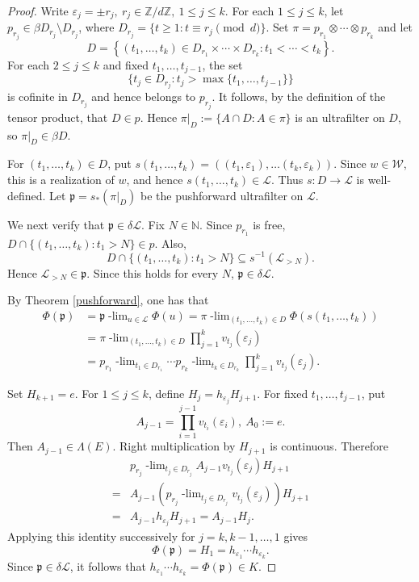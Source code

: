 \documentclass[11pt]{amsart}
\theoremstyle{definition}
\theoremstyle{remark}
\newcommand{\N}{\mathbb N}
\newcommand{\cL}{\mathcal L}
\newcommand{\ulim}[2]{#1\!\operatorname{-lim}_{#2}}
\begin{document}
\begin{proof}
 Write $\varepsilon_j=\pm r_j,\  r_j\in\mathbb Z/d\mathbb Z,
\ 1\leq j\leq k.$
For each $1 \le j\le k$, let $  p_{r_j} \in \beta D_{r_j} \setminus D_{r_j} $, where $D_{r_j} =\{t\geq1:t\equiv r_j\pmod d\}.$ 
Set $ \pi = p_{r_1}\otimes\cdots\otimes  p_{r_k}$ and let
\[
D=\left\{(t_1,\ldots,t_k)\in D_{r_1}\times\cdots\times D_{r_k}:t_1<\cdots<t_k\right\}.
\]
 For each $2\leq j\leq k$ and fixed $t_1,\ldots,t_{j-1}$, the set
\[
\{t_j\in D_{r_j}:t_j>\max\{t_1,\ldots,t_{j-1}\}\}
\]
is cofinite in $D_{r_j}$ and hence belongs to $p_{r_j}$.  It follows,
by the definition of the tensor product, that $D\in p$.
Hence $ \pi|_D:=\{A\cap D:A\in  \pi\}$
is an ultrafilter on $D$, so $ \pi|_D\in\beta D$.
 

 
 
For $(t_1,\ldots,t_k)\in D$, put $s(t_1,\ldots,t_k)=((t_1,\varepsilon_1),\ldots(t_k,\varepsilon_k))$.
Since $w\in\mathcal W$, this is a realization of $w$, and hence $s(t_1,\ldots,t_k)\in\mathcal L$. 
Thus $s:D\longrightarrow\mathcal L$ is well-defined.
Let $ \mathfrak p=s_*(  \pi|_D)$
be the pushforward ultrafilter on $\cL$.
 
 We next verify that $\mathfrak p\in \delta\cL$.
Fix $N\in\N$.  Since $ p_{r_1}$ is free, $D\cap\{(t_1,\ldots,t_k):t_1>N\}\in p$.
Also,
\[
 D\cap \{(t_1,\ldots,t_k):t_1>N\} \subseteq s^{-1}(\cL_{>N}).
\]
Hence $\cL_{>N}\in  \mathfrak p$.
Since this holds for every $N$, $ \mathfrak p \in\delta\cL$.

By Theorem \ref{pushforward}, one has that
\[
\begin{aligned}
 \Phi( \mathfrak p) &= \ulim{  \mathfrak p }{ u\in\mathcal L} \Phi(u)=\ulim{ \pi}{ (t_1,\ldots,t_k)\in D}\Phi(s(t_1, \ldots, t_k))\\
 &= \ulim{ \pi }{ (t_1,\ldots,t_k)\in D}\prod_{j=1}^k
v_{t_j}(\varepsilon_j)\\
 &=\ulim{ p_{r_1}}{t_1\in D_{r_1}}\cdots
   \ulim{  p_{r_k}}{t_k\in D_{r_k}}
   \prod_{j=1}^k v_{t_j}(\varepsilon_j).
\end{aligned}
\]
 
Set $H_{k+1}=e$.  For $1\leq j\leq k$, define $H_j=h_{\varepsilon_j}H_{j+1}$.
For fixed $t_1,\ldots,t_{j-1}$, put 
\[
 A_{j-1}=\prod_{i=1}^{j-1}v_{t_i}(\varepsilon_i), \ A_0:=e.   
\]
Then $A_{j-1}\in\Lambda(E)$.  Right multiplication by $H_{j+1}$ is continuous.  Therefore
\[
\begin{aligned}
 &\ulim{ p_{r_j}}{t_j\in D_{r_j}}
 A_{j-1}v_{t_j}(\varepsilon_j)H_{j+1}\\
  =&A_{j-1}\left(\ulim{ p_{r_j}}{t_j\in D_{r_j}}v_{t_j}(\varepsilon_j)\right)H_{j+1}\\
  =&A_{j-1}h_{\varepsilon_j}H_{j+1} = A_{j-1}H_j.
\end{aligned}
\] 
Applying this identity successively for $j=k,k-1,\ldots,1$ gives 
\[
 \Phi( \mathfrak p)=H_1=h_{\varepsilon_1}\cdots h_{\varepsilon_k}. 
\]
Since $ \mathfrak p\in\delta\mathcal L$, it follows that
$h_{\varepsilon_1}\cdots h_{\varepsilon_k}=\Phi( \mathfrak p)\in K$.
 
\end{proof}
\end{document}
